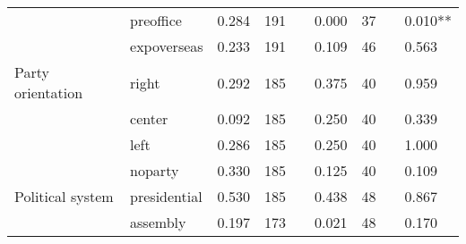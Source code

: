 \begin{table}[h!]
{\begin{threeparttable}
\begin{tabular}{llcclccll}
                                              & preoffice                                     & 0.284                 & 191                         &                      & 0.000        & 37                 &                      & 0.010**                                           \\
                                              & expoverseas                                   & 0.233                 & 191                         &                      & 0.109        & 46                 &                      & 0.563                                             \\
\hline Party orientation                             & right                                         & 0.292                 & 185                         &                      & 0.375        & 40                 &                      & 0.959                                             \\
                                              & center                                        & 0.092                 & 185                         &                      & 0.250        & 40                 &                      & 0.339                                             \\
                                              & left                                          & 0.286                 & 185                         &                      & 0.250        & 40                 &                      & 1.000                                             \\
                                              & noparty                                       & 0.330                 & 185                         &                      & 0.125        & 40                 &                      & 0.109                                             \\
\hline Political system                              & presidential                                  & 0.530                 & 185                         &                      & 0.438        & 48                 &                      & 0.867                                             \\
                                              & assembly                                      & 0.197                 & 173                         &                      & 0.021        & 48                 &                      & 0.170                                             \\

\end{tabular}
\end{threeparttable}}
\end{table}

